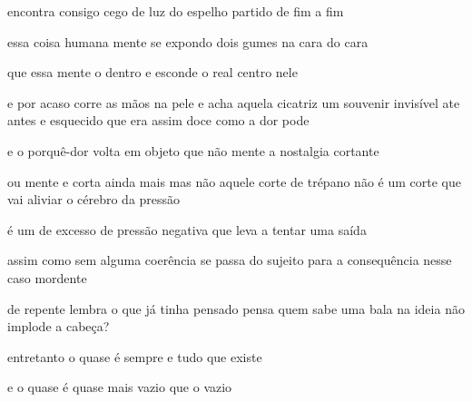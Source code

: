 \begin{poem}
\begin{stanza}
encontra consigo\verseline
cego de luz do\verseline
espelho partido\verseline
de fim a fim
\end{stanza}
\begin{stanza}
essa coisa humana\verseline
mente se expondo\verseline
dois gumes na cara do cara
\end{stanza}
\begin{stanza}
que essa mente o dentro\verseline
e esconde o real\verseline
centro \quad nele
\end{stanza}
\begin{stanza}
e por acaso corre\verseline
as mãos na pele\verseline
e acha\verseline
aquela cicatriz\verseline
um souvenir\verseline
invisível ate antes\verseline
e esquecido\verseline
que era assim doce\verseline
como a dor pode
\end{stanza}
\begin{stanza}
e o porquê-dor\verseline
volta em objeto\verseline
que não mente\verseline
a nostalgia\verseline
cortante
\end{stanza}
\begin{stanza}
ou mente\verseline
e corta ainda\verseline
mais \qquad mas\verseline
não aquele corte\verseline
de trépano não\verseline
é um corte que vai\verseline
aliviar o cérebro\verseline
da pressão
\end{stanza}
\begin{stanza}
é um \qquad de excesso\verseline
de pressão\verseline
negativa\verseline
que leva a tentar\verseline
uma saída
\end{stanza}
\begin{stanza}
assim como\verseline
sem alguma coerência\verseline
se passa do sujeito\verseline
para a consequência\verseline
nesse caso mordente
\end{stanza}
\begin{stanza}
de repente lembra\verseline
o que já tinha\verseline
pensado\verseline
pensa \quad quem sabe\verseline
uma bala na ideia\verseline
não implode\verseline
a cabeça?
\end{stanza}
\begin{stanza}
entretanto\verseline
o quase é sempre\verseline
e tudo que existe
\end{stanza}
\begin{stanza}
e o quase é quase mais\verseline
vazio que o vazio
\end{stanza}
\begin{stanza}

\end{stanza}
\end{poem}
